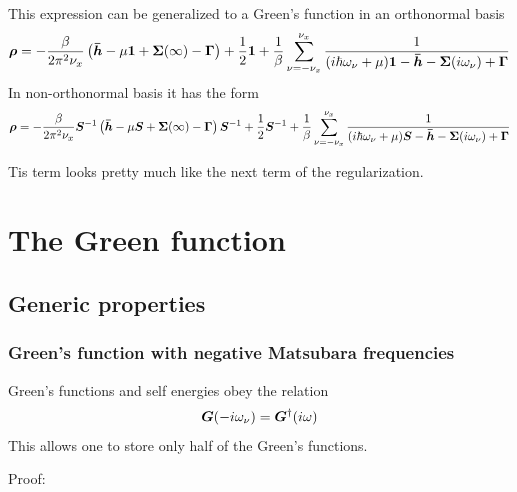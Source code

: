 \documentclass[11pt,a4paper]{report}
\begin{document}
This expression can be generalized to a Green's function in an orthonormal basis
\begin{eqnarray}
\bm{\rho}=-\frac{\beta}{2\pi^2\nu_x}
\left(\bm{\bar{h}}-\mu\bm{1}+\bm{\Sigma}(\infty)-\bm{\Gamma}\right)
+\frac{1}{2}\bm{1}
+\frac{1}{\beta}\sum_{\nu=-\nu_x}^{\nu_x}
\frac{1}{(i\hbar\omega_\nu+\mu)\bm{1}-\bm{\bar{h}}-\bm{\Sigma}(i\omega_\nu)+\bm{\Gamma}}
\end{eqnarray}
In non-orthonormal basis it has the form
\begin{eqnarray}
\bm{\rho}=-\frac{\beta}{2\pi^2\nu_x}
\bm{S}^{-1}\left(\bm{\bar{h}}-\mu\bm{S}+\bm{\Sigma}(\infty)-\bm{\Gamma}\right)\bm{S}^{-1}
+\frac{1}{2}\bm{S}^{-1}
+\frac{1}{\beta}\sum_{\nu=-\nu_x}^{\nu_x}
\frac{1}{(i\hbar\omega_\nu+\mu)\bm{S}-\bm{\bar{h}}-\bm{\Sigma}(i\omega_\nu)+\bm{\Gamma}}
\end{eqnarray}

Tis term looks pretty much like the next term of the regularization.


\chapter{The Green function}
\section{Generic properties}
\subsection{Green's function with negative Matsubara frequencies}
Green's functions and self energies obey the relation
\begin{eqnarray}
\bm{G}(-i\omega_\nu)=\bm{G}^\dagger(i\omega)
\label{eq:matsubaragnegfreq}
\end{eqnarray}
This allows one to store only half of the Green's functions.

Proof:
\end{document}
